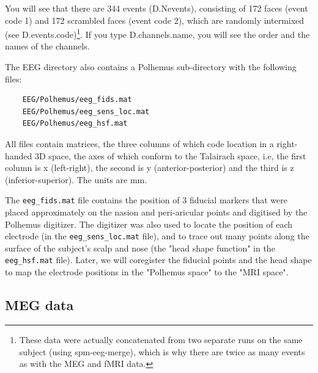 You will see that there are 344 events (D.Nevents), consisting of 172 faces (event code 1) and 172 scrambled faces (event code 2), which are randomly intermixed (see D.events.code)\footnote{These data were actually concatenated from two separate runs on the same subject (using spm-eeg-merge), which is why there are twice as many events as with the MEG and fMRI data.}. If you type D.channels.name, you will see the order and the names of the channels.

The EEG directory also contains a Polhemus sub-directory with the following files:
\begin{verbatim}
    EEG/Polhemus/eeg_fids.mat
    EEG/Polhemus/eeg_sens_loc.mat
    EEG/Polhemus/eeg_hsf.mat
\end{verbatim}
All files contain matrices, the three columns of which code location in a right-handed 3D space, the axes of which conform to the Talairach space, i.e, the first column is x (left-right), the second is y (anterior-posterior) and the third is z (inferior-superior). The units are mm.

The \verb!eeg_fids.mat! file contains the position of 3 fiducial markers that were placed approximately on the nasion and peri-aricular points and digitised by the Polhemus digitizer. The digitizer was also used to locate the position of each electrode (in the \verb!eeg_sens_loc.mat! file), and to trace out many points along the surface of the subject's scalp and nose (the "head shape function" in the \verb!eeg_hsf.mat! file). Later, we will coregister the fiducial points and the head shape to map the electrode positions in the "Polhemus space" to the "MRI space".

\subsection{MEG data \label{meg}}

